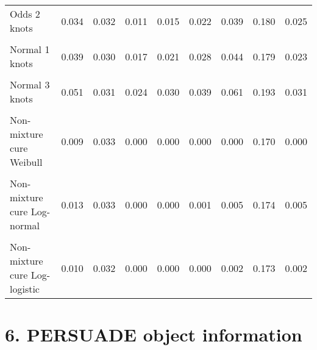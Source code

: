 \documentclass[
]{article}
\begin{document}
\begin{table}[H]
{\begin{tabular}[t]{lrrrrrrrr}
Odds 2 knots & 0.034 & 0.032 & 0.011 & 0.015 & 0.022 & 0.039 & 0.180 & 0.025\\
\cellcolor{gray!10}{Odds 3 knots} & \cellcolor{gray!10}{0.040} & \cellcolor{gray!10}{0.034} & \cellcolor{gray!10}{0.013} & \cellcolor{gray!10}{0.018} & \cellcolor{gray!10}{0.026} & \cellcolor{gray!10}{0.047} & \cellcolor{gray!10}{0.193} & \cellcolor{gray!10}{0.030}\\
Normal 1 knots & 0.039 & 0.030 & 0.017 & 0.021 & 0.028 & 0.044 & 0.179 & 0.023\\
\cellcolor{gray!10}{Normal 2 knots} & \cellcolor{gray!10}{0.040} & \cellcolor{gray!10}{0.030} & \cellcolor{gray!10}{0.018} & \cellcolor{gray!10}{0.022} & \cellcolor{gray!10}{0.029} & \cellcolor{gray!10}{0.046} & \cellcolor{gray!10}{0.177} & \cellcolor{gray!10}{0.024}\\
Normal 3 knots & 0.051 & 0.031 & 0.024 & 0.030 & 0.039 & 0.061 & 0.193 & 0.031\\
\cellcolor{gray!10}{Mixture cure Weibull} & \cellcolor{gray!10}{0.009} & \cellcolor{gray!10}{0.032} & \cellcolor{gray!10}{0.000} & \cellcolor{gray!10}{0.000} & \cellcolor{gray!10}{0.000} & \cellcolor{gray!10}{0.000} & \cellcolor{gray!10}{0.168} & \cellcolor{gray!10}{0.000}\\
Non-mixture cure Weibull & 0.009 & 0.033 & 0.000 & 0.000 & 0.000 & 0.000 & 0.170 & 0.000\\
\cellcolor{gray!10}{Mixture cure Log-normal} & \cellcolor{gray!10}{0.012} & \cellcolor{gray!10}{0.033} & \cellcolor{gray!10}{0.000} & \cellcolor{gray!10}{0.000} & \cellcolor{gray!10}{0.000} & \cellcolor{gray!10}{0.003} & \cellcolor{gray!10}{0.171} & \cellcolor{gray!10}{0.003}\\
Non-mixture cure Log-normal & 0.013 & 0.033 & 0.000 & 0.000 & 0.001 & 0.005 & 0.174 & 0.005\\
\cellcolor{gray!10}{Mixture cure Log-logistic} & \cellcolor{gray!10}{0.011} & \cellcolor{gray!10}{0.032} & \cellcolor{gray!10}{0.000} & \cellcolor{gray!10}{0.000} & \cellcolor{gray!10}{0.000} & \cellcolor{gray!10}{0.002} & \cellcolor{gray!10}{0.173} & \cellcolor{gray!10}{0.002}\\
Non-mixture cure Log-logistic & 0.010 & 0.032 & 0.000 & 0.000 & 0.000 & 0.002 & 0.173 & 0.002\\
\bottomrule
\end{tabular}}
\end{table}

\clearpage

\section{6. PERSUADE object
information}\label{persuade-object-information}
\end{document}
